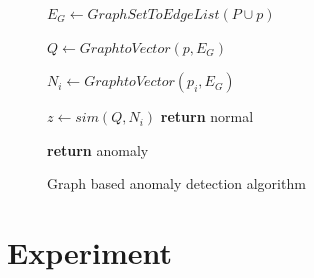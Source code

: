 \begin{figure}[h!]
\begin{algorithmic}[1]


\State $E_G \gets GraphSetToEdgeList(P \cup p)$

\State $Q \gets GraphtoVector(p, E_G)$ 

\State $N_i \gets GraphtoVector(p_i, E_G)$

\State $z \gets sim(Q, N_i)$
\State \textbf{return} normal

\EndIf

\EndFor	

\State \textbf{return} anomaly
\EndProcedure



\end{algorithmic}


\caption{Graph based anomaly detection algorithm}\label{alg:graph_anomaly}
\end{figure}






%

%






\section{Experiment}

